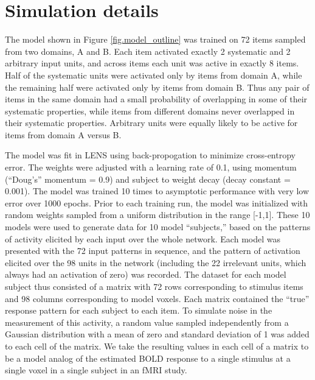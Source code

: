\section{Simulation details}
The model shown in Figure \ref{fig.model_outline} was trained on 72 items sampled from two domains, A and B. Each item activated exactly 2 systematic and 2 arbitrary input units, and across items each unit was active in exactly 8 items. Half of the systematic units were activated only by items from domain A, while the remaining half were activated only by items from domain B. Thus any pair of items in the same domain had a small probability of overlapping in some of their systematic properties, while items from different domains never overlapped in their systematic properties. Arbitrary units were equally likely to be active for items from domain A versus B.

The model was fit in LENS \cite{rohde_lens:_1999} using back-propogation to minimize cross-entropy error. The weights were adjusted with a learning rate of 0.1, using momentum (``Doug's'' momentum = 0.9) and subject to weight decay (decay constant = 0.001). The model was trained 10 times to asymptotic performance with very low error over 1000 epochs. Prior to each training run, the model was initialized with random weights sampled from a uniform distribution in the range [-1,1]. These 10 models were used to generate data for 10 model ``subjects,'' based on the patterns of activity elicited by each input over the whole network. Each model was presented with the 72 input patterns in sequence, and the pattern of activation elicited over the 98 units in the network (including the 22 irrelevant units, which always had an activation of zero) was recorded. The dataset for each model subject thus consisted of a matrix with 72 rows corresponding to stimulus items and 98 columns corresponding to model voxels. Each matrix contained the ``true'' response pattern for each subject to each item. To simulate noise in the measurement of this activity, a random value sampled independently from a Gaussian distribution with a mean of zero and standard deviation of 1 was added to each cell of the matrix. We take the resulting values in each cell of a matrix to be a model analog of the estimated BOLD response to a single stimulus at a single voxel in a single subject in an fMRI study. 

